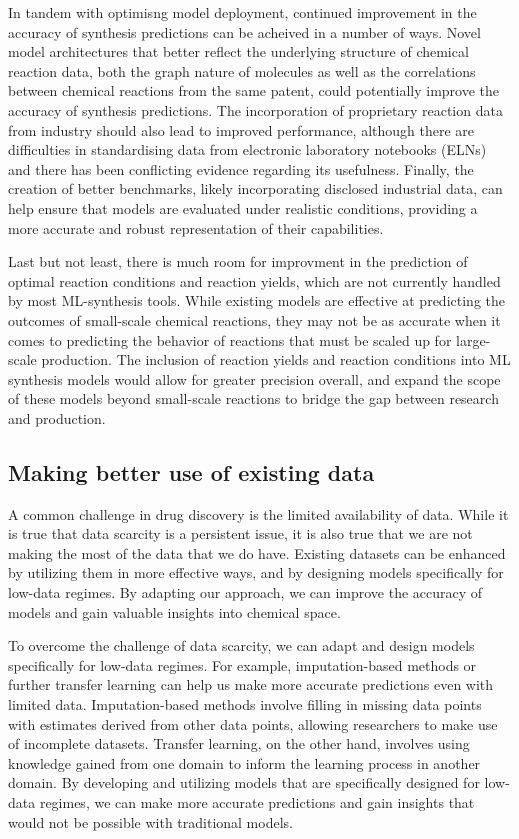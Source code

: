 In tandem with optimisng model deployment, continued improvement in the accuracy of synthesis predictions can be acheived in a number of ways. Novel model architectures that better reflect the underlying structure of chemical reaction data, both the graph nature of molecules as well as the correlations between chemical reactions from the same patent, could potentially improve the accuracy of synthesis predictions. The incorporation of proprietary reaction data from industry should also lead to improved performance, although there are difficulties in standardising data from electronic laboratory notebooks (ELNs) and there has been conflicting evidence regarding its usefulness. Finally, the creation of better benchmarks, likely incorporating disclosed industrial data, can help ensure that models are evaluated under realistic conditions, providing a more accurate and robust representation of their capabilities.

Last but not least, there is much room for improvment in the prediction of optimal reaction conditions and reaction yields, which are not currently handled by most ML-synthesis tools.  While existing models are effective at predicting the outcomes of small-scale chemical reactions, they may not be as accurate when it comes to predicting the behavior of reactions that must be scaled up for large-scale production. The inclusion of reaction yields and reaction conditions into ML synthesis models would allow for greater precision overall, and expand the scope of these models beyond small-scale reactions to bridge the gap between research and production.

\subsection{Making better use of existing data}

A common challenge in drug discovery is the limited availability of data. While it is true that data scarcity is a persistent issue, it is also true that we are not making the most of the data that we do have. Existing datasets can be enhanced by utilizing them in more effective ways, and by designing models specifically for low-data regimes. By adapting our approach, we can improve the accuracy of models and gain valuable insights into chemical space.

To overcome the challenge of data scarcity, we can adapt and design models specifically for low-data regimes. For example, imputation-based methods or further transfer learning can help us make more accurate predictions even with limited data. Imputation-based methods involve filling in missing data points with estimates derived from other data points, allowing researchers to make use of incomplete datasets. Transfer learning, on the other hand, involves using knowledge gained from one domain to inform the learning process in another domain. By developing and utilizing models that are specifically designed for low-data regimes, we can make more accurate predictions and gain insights that would not be possible with traditional models.

